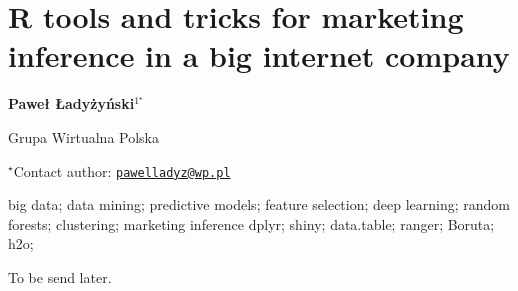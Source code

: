 \documentclass[\main/boa.tex]{subfiles}
\begin{document}
\pagestyle{empty}

\section{R tools and tricks for marketing inference in a big internet company}

\begin{center}
  {\bf Paweł Ładyżyński$^{1^\star}$}
\end{center}

\vskip 0.3cm

\begin{affiliations}
\begin{enumerate}
\begin{minipage}{0.915\textwidth}
\centering
\item Grupa Wirtualna Polska \\[-2pt]
\end{minipage}
\end{enumerate}
$^\star$Contact author: \href{mailto:pawelladyz@wp.pl}{\nolinkurl{pawelladyz@wp.pl}}\\
\end{affiliations}

\vskip 0.5cm

\begin{minipage}{0.915\textwidth}
\keywords big data; data mining; predictive models; feature selection; deep
learning; random forests; clustering; marketing inference
\packages dplyr; shiny; data.table; ranger; Boruta; h2o;
\end{minipage}

\vskip 0.8cm

To be send later.
\end{document}
